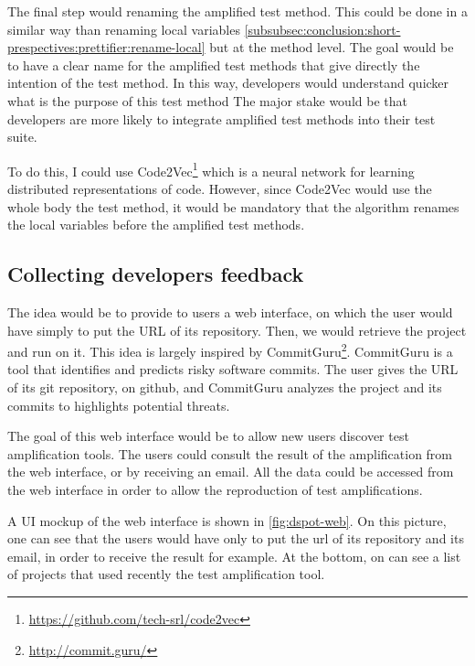 The final step would renaming the amplified test method.
This could be done in a similar way than renaming local variables \autoref{subsubsec:conclusion:short-prespectives:prettifier:rename-local} but at the method level.
The goal would be to have a clear name for the amplified test methods that give directly the intention of the test method.
In this way, developers would understand quicker what is the purpose of this test method
The major stake would be that developers are more likely to integrate amplified test methods into their test suite.

To do this, I could use Code2Vec\footnote{\url{https://github.com/tech-srl/code2vec}}\cite{DBLP:journals/corr/abs-1803-09473} which is a neural network for learning distributed representations of code.
However, since Code2Vec would use the whole body the test method, it would be mandatory that the algorithm renames the local variables before the amplified test methods.

\subsection{Collecting  developers feedback}
\label{subsec:conclusion:short-prespectives:web-interface}
The idea would be to provide to users a web interface, on which the user would have simply to put the URL of its \gh repository.
Then, we would retrieve the project and run \dspot on it.
This idea is largely inspired by CommitGuru\footnote{\url{http://commit.guru/}}\cite{Rosen:2015:FSE}.
CommitGuru is a tool that identifies and predicts risky software commits.
The user gives the URL of its git repository, \eg on github, and CommitGuru analyzes the project and its commits to highlights potential threats.

The goal of this web interface would be to allow new users discover test amplification tools.
The users could consult the result of the amplification from the web interface, or by receiving an email.
All the data could be accessed from the web interface in order to allow the reproduction of test amplifications.

A UI mockup of the web interface is shown in \autoref{fig:dspot-web}.
On this picture, one can see that the users would have only to put the url of its repository and its email, in order to receive the result for example.
At the bottom, on can see a list of projects that used recently the test amplification tool.

